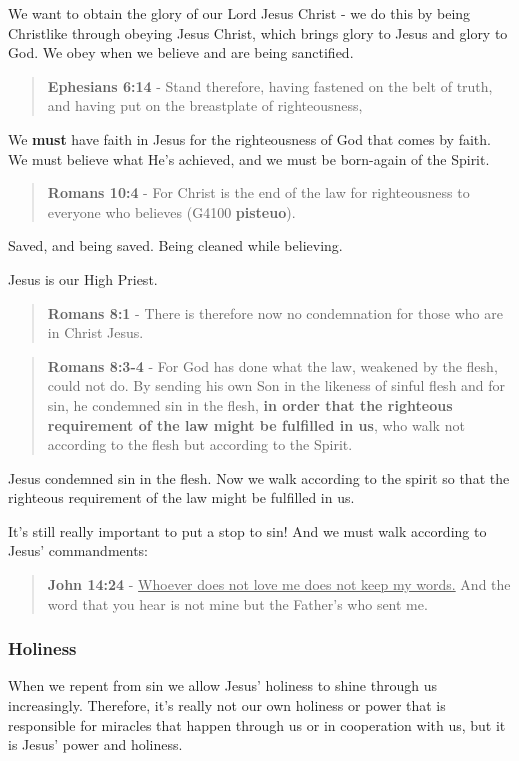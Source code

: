 \documentclass[11pt]{article}
\begin{document}
We want to obtain the glory of our Lord Jesus Christ - we do this by being Christlike through obeying Jesus Christ, which brings glory to Jesus and glory to God. We obey when we believe and are being sanctified.

\begin{quote}
\textbf{Ephesians 6:14} - Stand therefore, having fastened on the belt of truth, and having put on the breastplate of righteousness,
\end{quote}

We \textbf{must} have faith in Jesus for the righteousness of God that comes by faith.
We must believe what He's achieved, and we must be born-again of the Spirit.

\begin{quote}
\textbf{Romans 10:4} - For Christ is the end of the law for righteousness to everyone who believes (G4100 \textbf{pisteuo}).
\end{quote}

Saved, and being saved. Being cleaned while believing.

Jesus is our High Priest.

\begin{quote}
\textbf{Romans 8:1} - There is therefore now no condemnation for those who are in Christ Jesus.
\end{quote}

\begin{quote}
\textbf{Romans 8:3-4} - For God has done what the law, weakened by the flesh, could not do. By sending his own Son in the likeness of sinful flesh and for sin, he condemned sin in the flesh, \textbf{in order that the righteous requirement of the law might be fulfilled in us}, who walk not according to the flesh but according to the Spirit.
\end{quote}

Jesus condemned sin in the flesh. Now we walk according to the spirit so that the righteous requirement of the law might be fulfilled in us.

It's still really important to put a stop to sin! And we must walk according to Jesus' commandments:

\begin{quote}
\textbf{John 14:24} - \uline{Whoever does not love me does not keep my words.} And the word that you hear is not mine but the Father's who sent me.
\end{quote}

\subsubsection{Holiness}
\label{sec:org02687d8}
When we repent from sin we allow Jesus' holiness to shine through us increasingly.
Therefore, it's really not our own holiness or power that is responsible for miracles that happen through us or in cooperation with us, but it is Jesus' power and holiness.
\end{document}
